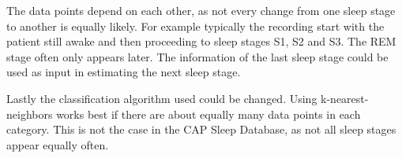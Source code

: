 \newpage
The data points depend on each other, as not every change from one sleep stage to another is equally likely. For example typically the recording start with the patient still awake and then proceeding to sleep stages S1, S2 and S3. The REM stage often only appears later. The information of the last sleep stage could be used as input in estimating the next sleep stage.

Lastly the classification algorithm used could be changed. Using k-nearest-neighbors works best if there are about equally many data points in each category. This is not the case in the CAP Sleep Database, as not all sleep stages appear equally often.